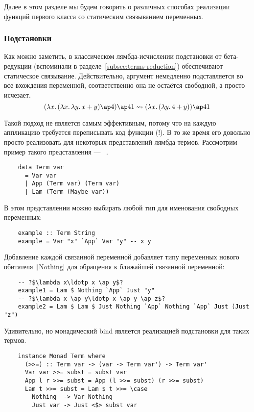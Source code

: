 Далее в этом разделе мы будем говорить о различных способах реализации функций первого класса со статическим связыванием переменных.

\subsubsection{Подстановки}

Как можно заметить, в классическом лямбда-исчислении подстановки от бета-редукции (вспоминали в разделе~\ref{subsec:terms-reduction}) обеспечивают статическое связывание.
Действительно, аргумент немедленно подставляется во все вхождения переменной, соответственно она не остаётся свободной, а просто исчезает.
\[
    (\lambda x\ldotp (\lambda x\ldotp \lambda y\ldotp x + y) \ap 4) \ap 41 \rightsquigarrow (\lambda x\ldotp (\lambda y\ldotp 4 + y)) \ap 41
\]

Такой подход не является самым эффективным, потому что на каждую аппликацию требуется переписывать код функции (!).
В то же время его довольно просто реализовать для некоторых представлений лямбда-термов.
Рассмотрим пример такого представления --- ~\cite{chargueraud2012locally}.

\begin{verbatim}
    data Term var
      = Var var
      | App (Term var) (Term var)
      | Lam (Term (Maybe var))
\end{verbatim}

В этом представлении можно выбирать любой тип для именования свободных переменных:
\begin{verbatim}
    example :: Term String
    example = Var "x" `App` Var "y" -- x y
\end{verbatim}
Добавление каждой связанной переменной добавляет типу переменных нового обитателя \texttt|Nothing| для обращения к ближайшей связанной переменной:
\begin{verbatim}
    -- ?$\lambda x\ldotp x \ap y$?
    example1 = Lam $ Nothing `App` Just "y"
    -- ?$\lambda x \ap y\ldotp x \ap y \ap z$?
    example2 = Lam $ Lam $ Just Nothing `App` Nothing `App` Just (Just "z")
\end{verbatim}

Удивительно, но монадический bind является реализацией подстановки для таких термов.

\begin{verbatim}
    instance Monad Term where
      (>>=) :: Term var -> (var -> Term var') -> Term var'
      Var var >>= subst = subst var
      App l r >>= subst = App (l >>= subst) (r >>= subst)
      Lam t >>= subst = Lam $ t >>= \case
        Nothing  -> Var Nothing
        Just var -> Just <$> subst var
\end{verbatim}

